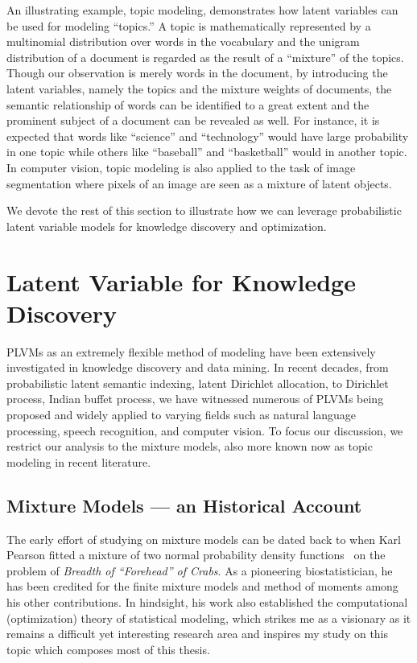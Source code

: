An illustrating example, topic modeling, demonstrates how latent variables can
be used for modeling ``topics.'' A topic is mathematically represented by a
multinomial distribution over words in the vocabulary and the unigram
distribution of a document is regarded as the result of a ``mixture'' of the
topics. Though our observation is merely words in the document, by introducing
the latent variables, namely the topics and the mixture weights of documents,
the semantic relationship of words can be identified to a great extent and the
prominent subject of a document can be revealed as well. For instance, it is
expected that words like ``science'' and ``technology'' would have large
probability in one topic while others like ``baseball'' and ``basketball'' would
in another topic. In computer vision, topic modeling is also applied to the task
of image segmentation where pixels of an image are seen as a mixture of latent
objects.

We devote the rest of this section to illustrate how we can leverage
probabilistic latent variable models for knowledge discovery and optimization.

\section{Latent Variable for Knowledge Discovery}

PLVMs as an extremely flexible method of modeling have been extensively
investigated in knowledge discovery and data mining. In recent decades, from
probabilistic latent semantic indexing, latent Dirichlet allocation, to
Dirichlet process, Indian buffet process, we have witnessed numerous of PLVMs
being proposed and widely applied to varying fields such as natural language
processing, speech recognition, and computer vision. To focus our discussion, we
restrict our analysis to the mixture models, also more known now as topic
modeling in recent literature.

\subsection{Mixture Models --- an Historical Account} The early effort of
studying on mixture models can be dated back to
\citeyear{pearson1896mathematical} when Karl Pearson fitted a mixture of two
normal probability density functions~\cite{pearson1896mathematical} on the
problem of \emph{Breadth of ``Forehead'' of Crabs}. As a pioneering
biostatistician, he has been credited for the finite mixture models and method
of moments among his other contributions. In hindsight, his work also
established the computational (optimization) theory of statistical modeling,
which strikes me as a visionary as it remains a difficult yet interesting
research area and inspires my study on this topic which composes most of this
thesis.

